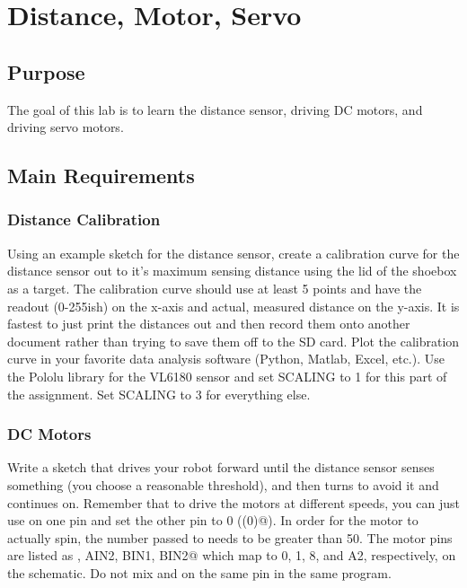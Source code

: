\chapter{Distance, Motor, Servo}

\section{Purpose}
The goal of this lab is to learn the distance sensor, driving DC motors, and driving 
servo motors.

\section{Main Requirements}
\subsection{Distance Calibration}
Using an example sketch for the distance sensor, create a calibration curve for the distance 
sensor out to it's maximum sensing distance using the lid of the shoebox as a target. The 
calibration curve should use at least 5 points and have the readout (0-255ish) on the x-axis
and actual, measured distance on the y-axis. It is fastest to just print the distances out and 
then record them onto another document rather than trying to save them off to the SD card.
Plot the calibration curve in your favorite data analysis software (Python, Matlab, Excel, etc.). 
Use the Pololu library for the VL6180 sensor and set SCALING to 1 for this part of the assignment.
Set SCALING to 3 for everything else.

\subsection{DC Motors}
Write a sketch that drives your robot forward until the distance sensor senses something 
(you choose a reasonable threshold), and then turns to avoid it and continues on. Remember
that to drive the motors at different speeds, you can just use \lstinline@analogWrite@ on 
one pin and set the other pin to 0 (\lstinline@analogWrite(0)@). In order for the motor to 
actually spin, the number passed to \lstinline@analogWrite@ needs to be greater than 50. 
The motor pins are listed as , AIN2, BIN1, BIN2@ which map to 0, 1, 8, 
and A2, respectively, on the schematic. Do not mix \lstinline@analogWrite@ and 
\lstinline@digitalWrite@ on the same pin in the same program.

